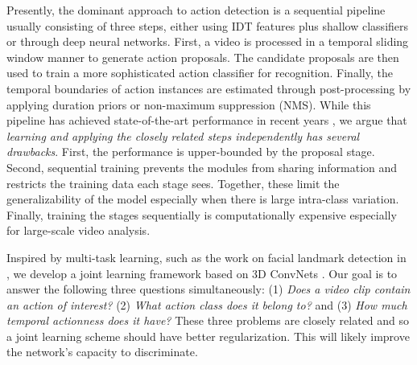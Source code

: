 \documentclass[10pt,twocolumn,letterpaper]{article}
\begin{document}
Presently, the dominant approach to action detection \cite{fast_temporal_action_proposal_fabian_cvpr16,tubelets_cvpr14_jain,yu_FAP_cvpr15,scnn_shou_wang_chang_cvpr16} is a sequential pipeline usually consisting of three steps, either using IDT features plus shallow classifiers or through deep neural networks. First, a video is processed in a temporal sliding window manner to generate action proposals. The candidate proposals are then used to train a more sophisticated action classifier for recognition. Finally, the temporal boundaries of action instances are estimated through post-processing by applying duration priors or non-maximum suppression (NMS). 
While this pipeline has achieved state-of-the-art performance in recent years \cite{learThumos2014,motion_appearance_thumos_wang14,florence_thumos2014,adsc_thumos_15}, we argue that \textit{learning and applying the closely related steps independently has several drawbacks}. First, the performance is upper-bounded by the proposal stage. Second, sequential training prevents the modules from sharing information and restricts the training data each stage sees. Together, these limit the generalizability of the model especially when there is large intra-class variation. Finally, training the stages sequentially is computationally expensive especially for large-scale video analysis.

Inspired by multi-task learning, such as the work on facial landmark detection in \cite{multi_task_face_zhang_eccv14}, we develop a joint learning framework based on 3D ConvNets \cite{c3d2015}. Our goal is to answer the following three questions simultaneously: (1) \textit{Does a video clip contain an action of interest?} (2) \textit{What action class does it belong to?} and (3) \textit{How much temporal actionness does it have?} 
These three problems are closely related and so a joint learning scheme should have better regularization. This will likely improve the network's capacity to discriminate.
\end{document}
